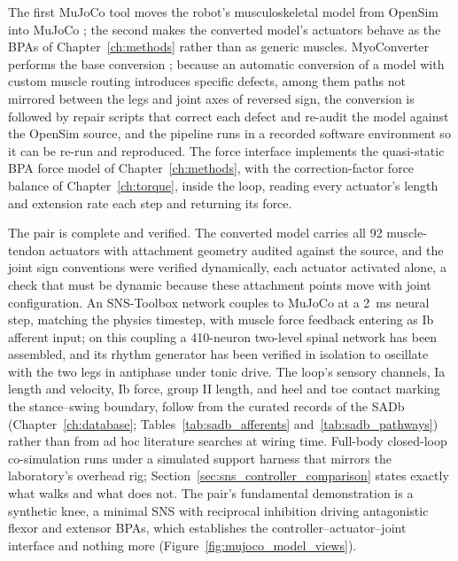 The first MuJoCo tool moves the robot's musculoskeletal model from OpenSim into MuJoCo \citep{delp_opensim_2007, todorov_mujoco_2012}; the second makes the converted model's actuators behave as the BPAs of Chapter~\ref{ch:methods} rather than as generic muscles. MyoConverter performs the base conversion \citep{caggiano_myosuite_2022, wang_myosim_2022}; because an automatic conversion of a model with custom muscle routing introduces specific defects, among them paths not mirrored between the legs and joint axes of reversed sign, the conversion is followed by repair scripts that correct each defect and re-audit the model against the OpenSim source, and the pipeline runs in a recorded software environment so it can be re-run and reproduced. The force interface implements the quasi-static BPA force model of Chapter~\ref{ch:methods}, with the correction-factor force balance of Chapter~\ref{ch:torque}, inside the loop, reading every actuator's length and extension rate each step and returning its force.

The pair is complete and verified. The converted model carries all 92 muscle-tendon actuators with attachment geometry audited against the source, and the joint sign conventions were verified dynamically, each actuator activated alone, a check that must be dynamic because these attachment points move with joint configuration. An SNS-Toolbox network couples to MuJoCo at a \qty{2}{\milli\second} neural step, matching the physics timestep, with muscle force feedback entering as Ib afferent input; on this coupling a 410-neuron two-level spinal network has been assembled, and its rhythm generator has been verified in isolation to oscillate with the two legs in antiphase under tonic drive. The loop's sensory channels, Ia length and velocity, Ib force, group II length, and heel and toe contact marking the stance--swing boundary, follow from the curated records of the SADb (Chapter~\ref{ch:database}; Tables~\ref{tab:sadb_afferents} and~\ref{tab:sadb_pathways}) rather than from ad hoc literature searches at wiring time. Full-body closed-loop co-simulation runs under a simulated support harness that mirrors the laboratory's overhead rig; Section~\ref{sec:sns_controller_comparison} states exactly what walks and what does not. The pair's fundamental demonstration is a synthetic knee, a minimal SNS with reciprocal inhibition driving antagonistic flexor and extensor BPAs, which establishes the controller--actuator--joint interface and nothing more (Figure~\ref{fig:mujoco_model_views}).


